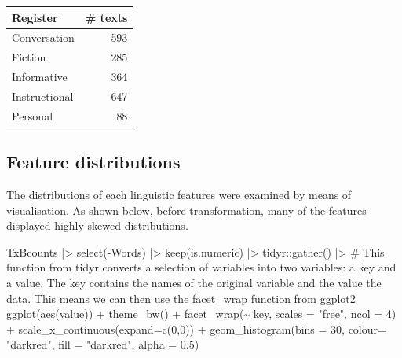 \documentclass[
  letterpaper,
  DIV=11,
  numbers=noendperiod]{scrreprt}
\newenvironment{Shaded}{\begin{snugshade}}{\end{snugshade}}
\newcommand{\AttributeTok}[1]{\textcolor[rgb]{0.40,0.45,0.13}{#1}}
\newcommand{\CommentTok}[1]{\textcolor[rgb]{0.37,0.37,0.37}{#1}}
\newcommand{\DecValTok}[1]{\textcolor[rgb]{0.68,0.00,0.00}{#1}}
\newcommand{\FloatTok}[1]{\textcolor[rgb]{0.68,0.00,0.00}{#1}}
\newcommand{\FunctionTok}[1]{\textcolor[rgb]{0.28,0.35,0.67}{#1}}
\newcommand{\NormalTok}[1]{\textcolor[rgb]{0.00,0.23,0.31}{#1}}
\newcommand{\SpecialCharTok}[1]{\textcolor[rgb]{0.37,0.37,0.37}{#1}}
\newcommand{\StringTok}[1]{\textcolor[rgb]{0.13,0.47,0.30}{#1}}
\begin{document}
\begin{longtable}[]{@{}lr@{}}
\toprule\noalign{}
Register & \# texts \\
\midrule\noalign{}
\endhead
\bottomrule\noalign{}
\endlastfoot
Conversation & 593 \\
Fiction & 285 \\
Informative & 364 \\
Instructional & 647 \\
Personal & 88 \\
\end{longtable}

\subsection{Feature distributions}\label{feature-distributions}

The distributions of each linguistic features were examined by means of
visualisation. As shown below, before transformation, many of the
features displayed highly skewed distributions.

\begin{Shaded}
\begin{Highlighting}[]
\NormalTok{TxBcounts }\SpecialCharTok{|\textgreater{}} 
  \FunctionTok{select}\NormalTok{(}\SpecialCharTok{{-}}\NormalTok{Words) }\SpecialCharTok{|\textgreater{}}  
  \FunctionTok{keep}\NormalTok{(is.numeric) }\SpecialCharTok{|\textgreater{}}  
\NormalTok{  tidyr}\SpecialCharTok{::}\FunctionTok{gather}\NormalTok{() }\SpecialCharTok{|\textgreater{}}  \CommentTok{\# This function from tidyr converts a selection of variables into two variables: a key and a value. The key contains the names of the original variable and the value the data. This means we can then use the facet\_wrap function from ggplot2}
  \FunctionTok{ggplot}\NormalTok{(}\FunctionTok{aes}\NormalTok{(value)) }\SpecialCharTok{+}
    \FunctionTok{theme\_bw}\NormalTok{() }\SpecialCharTok{+}
    \FunctionTok{facet\_wrap}\NormalTok{(}\SpecialCharTok{\textasciitilde{}}\NormalTok{ key, }\AttributeTok{scales =} \StringTok{"free"}\NormalTok{, }\AttributeTok{ncol =} \DecValTok{4}\NormalTok{) }\SpecialCharTok{+}
    \FunctionTok{scale\_x\_continuous}\NormalTok{(}\AttributeTok{expand=}\FunctionTok{c}\NormalTok{(}\DecValTok{0}\NormalTok{,}\DecValTok{0}\NormalTok{)) }\SpecialCharTok{+}
    \FunctionTok{geom\_histogram}\NormalTok{(}\AttributeTok{bins =} \DecValTok{30}\NormalTok{, }\AttributeTok{colour=} \StringTok{"darkred"}\NormalTok{, }\AttributeTok{fill =} \StringTok{"darkred"}\NormalTok{, }\AttributeTok{alpha =} \FloatTok{0.5}\NormalTok{)}
\end{Highlighting}
\end{Shaded}
\end{document}
